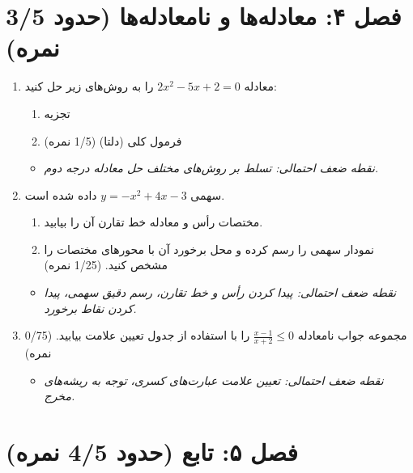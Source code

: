 \documentclass[12pt,a4paper]{article}
\begin{document}
\section*{\textbf{فصل ۴: معادله‌ها و نامعادله‌ها (حدود 3/5 نمره)}}
\begin{enumerate}[label=\arabic*., start=8, rightmargin=1em, itemsep=1em]
    \item معادله $2x^2 - 5x + 2 = 0$ را به روش‌های زیر حل کنید:
    \begin{enumerate}[label=\abjad*), itemsep=0.5em]
        \item تجزیه
        \item فرمول کلی (دلتا) (1/5 نمره)
    \end{enumerate}
    \begin{itemize}[label=$\circ$, rightmargin=2em]
        \item \textit{نقطه ضعف احتمالی: تسلط بر روش‌های مختلف حل معادله درجه دوم.}
    \end{itemize}

    \item سهمی $y = -x^2 + 4x - 3$ داده شده است.
    \begin{enumerate}[label=\abjad*), itemsep=0.5em]
        \item مختصات رأس و معادله خط تقارن آن را بیابید.
        \item نمودار سهمی را رسم کرده و محل برخورد آن با محورهای مختصات را مشخص کنید. (1/25 نمره)
    \end{enumerate}
    \begin{itemize}[label=$\circ$, rightmargin=2em]
        \item \textit{نقطه ضعف احتمالی: پیدا کردن رأس و خط تقارن، رسم دقیق سهمی، پیدا کردن نقاط برخورد.}
    \end{itemize}

    \item مجموعه جواب نامعادله $\frac{x-1}{x+2} \le 0$ را با استفاده از جدول تعیین علامت بیابید. (0/75 نمره)
    \begin{itemize}[label=$\circ$, rightmargin=2em]
        \item \textit{نقطه ضعف احتمالی: تعیین علامت عبارت‌های کسری، توجه به ریشه‌های مخرج.}
    \end{itemize}
\end{enumerate}

\hrulefill
\vspace{1em}

\section*{\textbf{فصل ۵: تابع (حدود 4/5 نمره)}}
\end{document}
